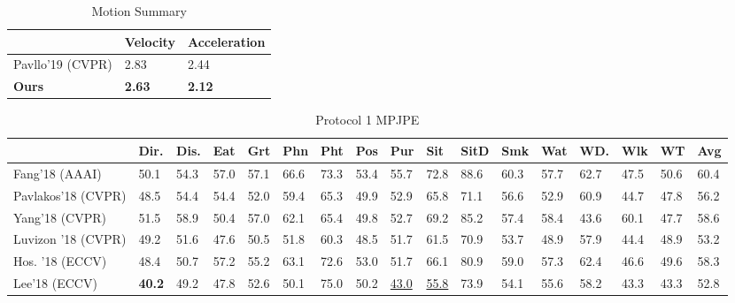 \documentclass[runningheads]{llncs}
\begin{document}
\begin{table}
\caption{Motion Summary}
\begin{center}
\small
\begin{tabular}{|l|l|l|}\hline
& Velocity & Acceleration\\ \hline
Pavllo'19 (CVPR) & 2.83 & 2.44\\ \hline
\textbf{Ours} & \textbf{2.63} & \textbf{2.12}\\ \hline
\end{tabular}
\end{center}
\label{table:motion-summary}
\end{table}

\begin{table}
\caption{Protocol 1 MPJPE}
\begin{center}
\tiny
\begin{tabular}{|l|l|l|l|l|l|l|l|l|l|l|l|l|l|l|l|l| }\hline

 & Dir.& Dis.& Eat & Grt & Phn & Pht& Pos& Pur & Sit& SitD & Smk & Wat & WD. & Wlk & WT & Avg \\ \hline








Fang'18 (AAAI)& 50.1 & 54.3 & 57.0 & 57.1 & 66.6 & 73.3 & 53.4 & 55.7 & 72.8 & 88.6 & 60.3 & 57.7 & 62.7 & 47.5 & 50.6 & 60.4 \\ \hline

Pavlakos'18 (CVPR) & 48.5 & 54.4 & 54.4 & 52.0 & 59.4 & 65.3 & 49.9 & 52.9 & 65.8 & 71.1 & 56.6 & 52.9 & 60.9 & 44.7 & 47.8 & 56.2 \\ \hline

Yang'18 (CVPR) & 51.5 & 58.9 & 50.4 & 57.0 & 62.1 & 65.4 & 49.8 & 52.7 & 69.2 & 85.2 & 57.4 & 58.4 & 43.6 & 60.1 & 47.7 & 58.6 \\ \hline

Luvizon '18 (CVPR)& 49.2 & 51.6 & 47.6 & 50.5 & 51.8 & 60.3 & 48.5 & 51.7 & 61.5 & 70.9 & 53.7 & 48.9 & 57.9 & 44.4 & 48.9 & 53.2 \\ \hline

Hos. '18 (ECCV)& 48.4 & 50.7 & 57.2 & 55.2 & 63.1 & 72.6 & 53.0 & 51.7 & 66.1 & 80.9 & 59.0 & 57.3 & 62.4 & 46.6 & 49.6 & 58.3 \\ \hline

Lee'18 (ECCV)& \textbf{40.2}  & 49.2  & 47.8  & 52.6  & 50.1  & 75.0  & 50.2  & \underline{43.0}  & \underline{55.8}  & 73.9 & 54.1 & 55.6 & 58.2 & 43.3 & 43.3 & 52.8 \\ \hline


\end{tabular}
\end{center}
\end{table}
\end{document}

